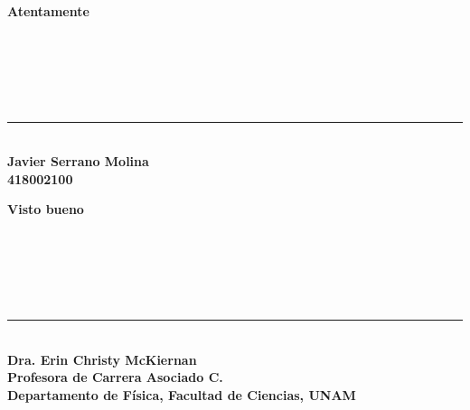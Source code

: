 \documentclass[11pt,letterpaper]{article}
\begin{document}
\begin{multicols}{2}
 \begin{center}
\textbf{Atentamente} \\
\hfill \\
\hfill \\
\hfill \\
\hfill \\
\hfill \\
\rule{7cm}{0.4pt}\\
\textbf{Javier Serrano Molina}\\
\textbf{418002100}
\end{center}
 \columnbreak
 \begin{center}
\textbf{Visto bueno} \\
\hfill \\
\hfill \\
\hfill \\
\hfill \\
\hfill \\
\rule{7cm}{0.4pt}\\
\textbf{Dra. Erin Christy McKiernan}\\
\textbf{Profesora de Carrera Asociado C.}\\
\textbf{Departamento de Física, Facultad de Ciencias, UNAM}
\end{center}
\end{multicols}
\end{document}
